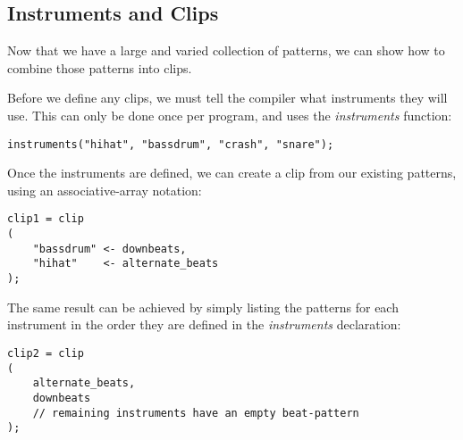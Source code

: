 \subsection{Instruments and Clips}

Now that we have a large and varied collection of patterns, we can show how to combine those patterns into clips.

Before we define any clips, we must tell the compiler what instruments they will use.
This can only be done once per program, and uses the \textit{instruments} function:

\begin{verbatim}
instruments("hihat", "bassdrum", "crash", "snare");
\end{verbatim}

Once the instruments are defined, we can create a clip from our existing patterns, using an
associative-array notation:

\begin{verbatim}
clip1 = clip
(
    "bassdrum" <- downbeats,
    "hihat"    <- alternate_beats
);
\end{verbatim}

The same result can be achieved by simply listing the patterns for each instrument in the order they are defined in the \textit{instruments} declaration:
\begin{verbatim}
clip2 = clip
(
    alternate_beats,
    downbeats
    // remaining instruments have an empty beat-pattern
);

\end{verbatim}

